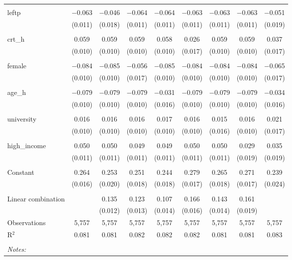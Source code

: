 \begin{table}[!htbp]
\begin{tabular}{@{\extracolsep{5pt}}lcccccccc}
  & & & & & & & & \\ 
 leftp & $-$0.063 & $-$0.046 & $-$0.064 & $-$0.064 & $-$0.063 & $-$0.063 & $-$0.063 & $-$0.051 \\ 
  & (0.011) & (0.018) & (0.011) & (0.011) & (0.011) & (0.011) & (0.011) & (0.019) \\ 
  & & & & & & & & \\ 
 crt\_h & 0.059 & 0.059 & 0.059 & 0.058 & 0.026 & 0.059 & 0.059 & 0.037 \\ 
  & (0.010) & (0.010) & (0.010) & (0.010) & (0.017) & (0.010) & (0.010) & (0.017) \\ 
  & & & & & & & & \\ 
 female & $-$0.084 & $-$0.085 & $-$0.056 & $-$0.085 & $-$0.084 & $-$0.084 & $-$0.084 & $-$0.065 \\ 
  & (0.010) & (0.010) & (0.017) & (0.010) & (0.010) & (0.010) & (0.010) & (0.017) \\ 
  & & & & & & & & \\ 
 age\_h & $-$0.079 & $-$0.079 & $-$0.079 & $-$0.031 & $-$0.079 & $-$0.079 & $-$0.079 & $-$0.034 \\ 
  & (0.010) & (0.010) & (0.010) & (0.016) & (0.010) & (0.010) & (0.010) & (0.016) \\ 
  & & & & & & & & \\ 
 university & 0.016 & 0.016 & 0.016 & 0.017 & 0.016 & 0.015 & 0.016 & 0.021 \\ 
  & (0.010) & (0.010) & (0.010) & (0.010) & (0.010) & (0.016) & (0.010) & (0.017) \\ 
  & & & & & & & & \\ 
 high\_income & 0.050 & 0.050 & 0.049 & 0.049 & 0.050 & 0.050 & 0.029 & 0.035 \\ 
  & (0.011) & (0.011) & (0.011) & (0.011) & (0.011) & (0.011) & (0.019) & (0.019) \\ 
  & & & & & & & & \\ 
 Constant & 0.264 & 0.253 & 0.251 & 0.244 & 0.279 & 0.265 & 0.271 & 0.239 \\ 
  & (0.016) & (0.020) & (0.018) & (0.018) & (0.017) & (0.018) & (0.017) & (0.024) \\ 
  & & & & & & & & \\ 
Linear combination &   & 0.135 & 0.123 & 0.107 & 0.166 & 0.143 & 0.161 &  \\ 
 &  & (0.012) & (0.013) & (0.014) & (0.016) & (0.014) & (0.019) &  \\ 
Observations & 5,757 & 5,757 & 5,757 & 5,757 & 5,757 & 5,757 & 5,757 & 5,757 \\ 
R$^{2}$ & 0.081 & 0.081 & 0.082 & 0.082 & 0.082 & 0.081 & 0.081 & 0.083 \\ 
\hline \\[-1.8ex] 
\textit{Notes:} & \multicolumn{8}{l}{} \\ 
\end{tabular} 
\end{table} 
